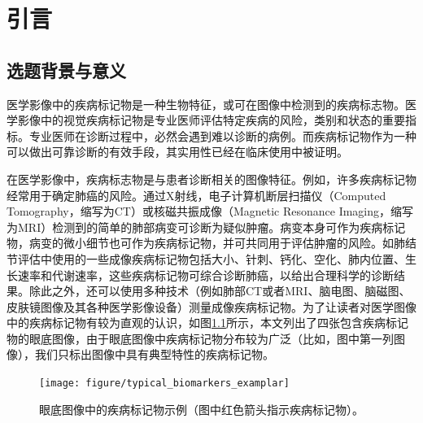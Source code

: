 \chapter{引言}\label{cha:introduction}
\section{选题背景与意义}
\label{sec:background}
医学影像中的疾病标记物是一种生物特征，或可在图像中检测到的疾病标志物。医学影像中的视觉疾病标记物是专业医师评估特定疾病的风险，类别和状态的重要指标。专业医师在诊断过程中，必然会遇到难以诊断的病例。而疾病标记物作为一种可以做出可靠诊断的有效手段，其实用性已经在临床使用中被证明。

在医学影像中，疾病标志物是与患者诊断相关的图像特征。例如，许多疾病标记物经常用于确定肺癌的风险。通过X射线，电子计算机断层扫描仪（Computed Tomography，缩写为CT）或核磁共振成像（Magnetic Resonance Imaging，缩写为MRI）检测到的简单的肺部病变可诊断为疑似肿瘤。病变本身可作为疾病标记物，病变的微小细节也可作为疾病标记物，并可共同用于评估肿瘤的风险。如肺结节评估中使用的一些成像疾病标记物包括大小、针刺、钙化、空化、肺内位置、生长速率和代谢速率，这些疾病标记物可综合诊断肺癌，以给出合理科学的诊断结果。除此之外，还可以使用多种技术（例如肺部CT或者MRI、脑电图、脑磁图、皮肤镜图像及其各种医学影像设备）测量成像疾病标记物。为了让读者对医学图像中的疾病标记物有较为直观的认识，如图\ref{mul_fig:medical_imaging_biomarkers_examplar}所示，本文列出了四张包含疾病标记物的眼底图像，由于眼底图像中疾病标记物分布较为广泛（比如，图中第一列图像），我们只标出图像中具有典型特性的疾病标记物。
\begin{figure}[h]
	\centering
	\texttt{[image: figure/typical\_biomarkers\_examplar]}
	\caption[眼底图像中的疾病标记物示例]{眼底图像中的疾病标记物示例（图中红色箭头指示疾病标记物）。}
	\label{mul_fig:medical_imaging_biomarkers_examplar}
\end{figure}


